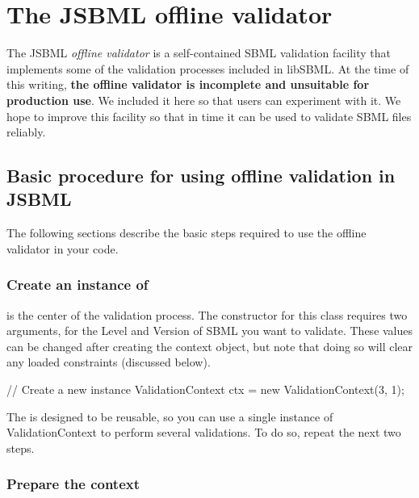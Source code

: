 
\section[Offline validation]{The JSBML offline validator}

The JSBML \emph{offline validator} is a self-contained SBML validation facility that implements some of the validation processes included in libSBML.  At the time of this writing, \textbf{the offline validator is incomplete and unsuitable for production use}.  We included it here so that users can experiment with it.  We hope to improve this facility so that in time it can be used to validate SBML files reliably.


\subsection{Basic procedure for using offline validation in JSBML}

The following sections describe the basic steps required to use the offline
validator in your code.


\subsubsection{Create an instance of }

 is the center of the validation process.  The
constructor for this class requires two arguments, for the Level and Version
of SBML you want to validate. These values can be changed after creating the
context object, but note that doing so will clear any loaded constraints
(discussed below).

\vspace*{1ex}
\begin{example}[style=java, title={Setup a ValidationContext.}]
// Create a new instance
ValidationContext ctx = new ValidationContext(3, 1);
\end{example}

The  is designed to be reusable, so you can use a
single instance of ValidationContext to perform several validations.  To do
so, repeat the next two steps.


\subsubsection{Prepare the context}

